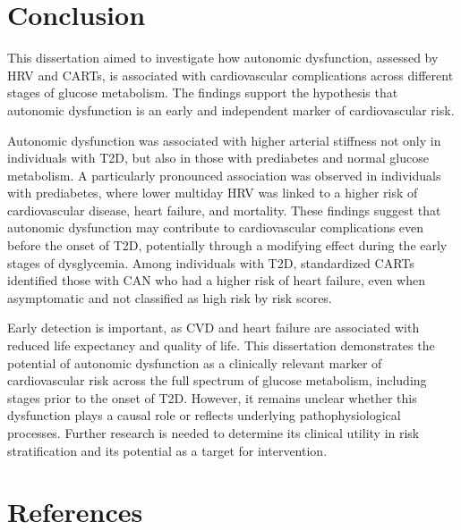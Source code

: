 \documentclass[
  letterpaper,
  headsepline=true,
  open=any]{scrbook}
\begin{document}

\hypertarget{conclusion}{%
\chapter{Conclusion}\label{conclusion}}

\newpage

This dissertation aimed to investigate how autonomic dysfunction,
assessed by HRV and CARTs, is associated with cardiovascular
complications across different stages of glucose metabolism. The
findings support the hypothesis that autonomic dysfunction is an early
and independent marker of cardiovascular risk.

Autonomic dysfunction was associated with higher arterial stiffness not
only in individuals with T2D, but also in those with prediabetes and
normal glucose metabolism. A particularly pronounced association was
observed in individuals with prediabetes, where lower multiday HRV was
linked to a higher risk of cardiovascular disease, heart failure, and
mortality. These findings suggest that autonomic dysfunction may
contribute to cardiovascular complications even before the onset of T2D,
potentially through a modifying effect during the early stages of
dysglycemia. Among individuals with T2D, standardized CARTs identified
those with CAN who had a higher risk of heart failure, even when
asymptomatic and not classified as high risk by risk scores.

Early detection is important, as CVD and heart failure are associated
with reduced life expectancy and quality of life. This dissertation
demonstrates the potential of autonomic dysfunction as a clinically
relevant marker of cardiovascular risk across the full spectrum of
glucose metabolism, including stages prior to the onset of T2D. However,
it remains unclear whether this dysfunction plays a causal role or
reflects underlying pathophysiological processes. Further research is
needed to determine its clinical utility in risk stratification and its
potential as a target for intervention.


\hypertarget{references}{%
\chapter*{References}\label{references}}

\end{document}
